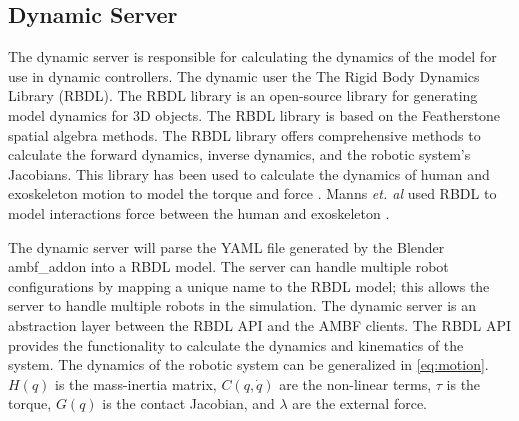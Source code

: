  



 
 
 
 
 \subsection{Dynamic Server}
 The dynamic server is responsible for calculating the dynamics of the model for use in dynamic controllers. The dynamic user the The Rigid Body Dynamics Library (RBDL)\cite{Felis2016}. The RBDL library is an open-source library for generating model dynamics for 3D objects. The RBDL library is based on the Featherstone spatial algebra methods. The RBDL library offers comprehensive methods to calculate the forward dynamics, inverse dynamics, and the robotic system's Jacobians. This library has been used to calculate the dynamics of human and exoskeleton motion to model the torque and force \cite{millard2017predicting} \cite{harant2017parameter}. Manns \textit{et. al} used RBDL to model interactions force between the human and exoskeleton \cite{manns2017motion}. 
 
 The dynamic server will parse the YAML file generated by the Blender ambf\_addon into a RBDL model. The server can handle multiple robot configurations by mapping a unique name to the RBDL model; this allows the server to handle multiple robots in the simulation. 
 The dynamic server is an abstraction layer between the RBDL API and the AMBF clients. The RBDL API provides the functionality to calculate the dynamics and kinematics of the system. The dynamics of the robotic system can be generalized in  \autoref{eq:motion}. $H(q)$ is the mass-inertia matrix, $C(q,\Dot{q})$ are the non-linear terms, $\tau$ is the torque,  $G(q)$ is the contact Jacobian, and $\lambda$ are the external force. 

